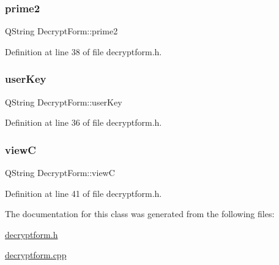 \subsubsection{\texorpdfstring{prime2}{prime2}}
{\footnotesize\ttfamily Q\+String Decrypt\+Form\+::prime2\hspace{0.3cm}{\ttfamily [protected]}}



Definition at line 38 of file decryptform.\+h.

\hypertarget{class_decrypt_form_a9b9b4da9c4713812a4ef07e8e60dd25a}{}\label{class_decrypt_form_a9b9b4da9c4713812a4ef07e8e60dd25a} 
\subsubsection{\texorpdfstring{user\+Key}{userKey}}
{\footnotesize\ttfamily Q\+String Decrypt\+Form\+::user\+Key\hspace{0.3cm}{\ttfamily [protected]}}



Definition at line 36 of file decryptform.\+h.

\hypertarget{class_decrypt_form_a6363fdac4c8f9ebbdc902f1b8e3686a3}{}\label{class_decrypt_form_a6363fdac4c8f9ebbdc902f1b8e3686a3} 
\subsubsection{\texorpdfstring{viewC}{viewC}}
{\footnotesize\ttfamily Q\+String Decrypt\+Form\+::viewC\hspace{0.3cm}{\ttfamily [protected]}}



Definition at line 41 of file decryptform.\+h.



The documentation for this class was generated from the following files\+:\begin{DoxyCompactItemize}
\item 
\hyperlink{decryptform_8h}{decryptform.\+h}\item 
\hyperlink{decryptform_8cpp}{decryptform.\+cpp}\end{DoxyCompactItemize}
